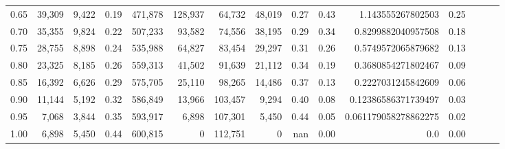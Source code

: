\begin{tabular}{rrrrrrrrrrrrrrr}
0.65 &  39,309 &  9,422 &  0.19 &  471,878 &  128,937 &   64,732 &   48,019 &  0.27 &  0.43 &     1.143555267802503 &      0.25 \\
0.70 &  35,355 &  9,824 &  0.22 &  507,233 &   93,582 &   74,556 &   38,195 &  0.29 &  0.34 &    0.8299882040957508 &      0.18 \\
0.75 &  28,755 &  8,898 &  0.24 &  535,988 &   64,827 &   83,454 &   29,297 &  0.31 &  0.26 &    0.5749572065879682 &      0.13 \\
0.80 &  23,325 &  8,185 &  0.26 &  559,313 &   41,502 &   91,639 &   21,112 &  0.34 &  0.19 &    0.3680854271802467 &      0.09 \\
0.85 &  16,392 &  6,626 &  0.29 &  575,705 &   25,110 &   98,265 &   14,486 &  0.37 &  0.13 &    0.2227031245842609 &      0.06 \\
0.90 &  11,144 &  5,192 &  0.32 &  586,849 &   13,966 &  103,457 &    9,294 &  0.40 &  0.08 &   0.12386586371739497 &      0.03 \\
0.95 &   7,068 &  3,844 &  0.35 &  593,917 &    6,898 &  107,301 &    5,450 &  0.44 &  0.05 &  0.061179058278862275 &      0.02 \\
1.00 &   6,898 &  5,450 &  0.44 &  600,815 &        0 &  112,751 &        0 &   nan &  0.00 &                   0.0 &      0.00 \\
\bottomrule
\end{tabular}
